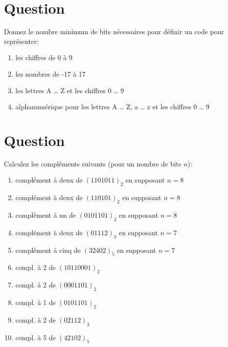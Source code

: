 \documentclass[letter, oneside]{book}
\begin{document}
\section*{Question}
\label{sec:orgff39fc1}
Donnez le nombre minimum de bits nécessaires pour définir un code
   pour représenter:

\begin{enumerate}
\item les chiffres de 0 à 9

\item les nombres de -17 à 17

\item les lettres A \dots{} Z et les chiffres 0 \dots{} 9

\item alphanumérique pour les lettres A \dots{} Z, a \dots{} z et les
chiffres 0 \dots{} 9
\end{enumerate}

\section*{Question}
\label{sec:org789aa9e}
Calculez les compléments suivants (pour un nombre de bits \(n\)):

\begin{enumerate}
\item complément à deux de \((1101011)_2\) en supposant \(n=8\)

\item complément à deux de \((110101)_2\) en supposant \(n=8\)

\item complément à un de \((0101101)_2\) en supposant \(n=8\)

\item complément à deux de \((01112)_3\) en supposant \(n=7\)

\item complément à cinq de \((32402)_5\) en supposant \(n=7\)

\item compl. à 2 de \((10110001)_2\)

\item compl. à 2 de \((0001101)_2\)

\item compl. à 1 de \((0101101)_2\)

\item compl. à 2 de \((02112)_3\)

\item compl. à 5 de \((42102)_5\)
\end{enumerate}
\end{document}
